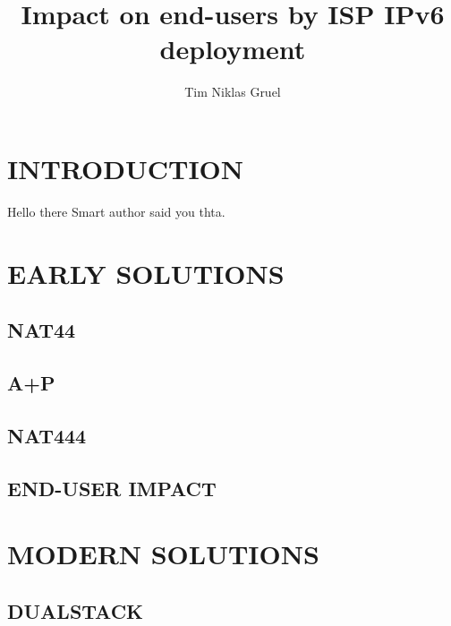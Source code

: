 \documentclass[format=sigconf, natbib=true, nonacm=true]{acmart}
\begin{document}
    \title{Impact on end-users by ISP IPv6 deployment}

    \author{Tim Niklas Gruel}

    

    \begin{abstract}
        \lipsum[2]
    \end{abstract}


    \maketitle

    \section{INTRODUCTION}
    \lipsum[1-10]
    Hello there Smart author said you\cite{7119767} thta.

    \section{EARLY SOLUTIONS}
    \lipsum[11]
    \subsection{NAT44}
    \lipsum[12-15]
    \subsection{A+P}
    \lipsum[14-16]
    \subsection{NAT444}
    \lipsum[16-18]
    \subsection*{END-USER IMPACT}
    \lipsum[18-22]

    \section{MODERN SOLUTIONS}
    \lipsum[21]
    \subsection{DUALSTACK}
    \lipsum[22-25]
\end{document}
